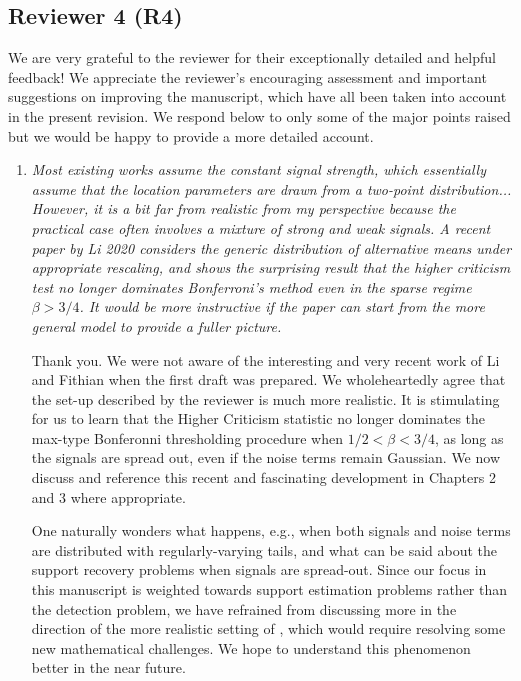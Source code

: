 \documentclass[11pt]{article}
\begin{document}
   \subsection{Reviewer 4 (R4)}
   
   We are very grateful to the reviewer for their exceptionally detailed and helpful feedback!  We appreciate the reviewer's encouraging assessment and 
   important suggestions on improving the manuscript, which have all been taken into account in the present revision.  We respond below to only some
   of the major points raised but we would be happy to provide a more detailed account.
  
   \begin{enumerate}
    \item {\em Most existing works assume the constant signal strength, which essentially assume that the location parameters are drawn from a two-point distribution... However, it is a bit far from realistic from my perspective because the practical case often involves a mixture of strong and weak signals. A recent paper by Li 2020 considers the generic distribution of alternative means under appropriate rescaling, and shows the surprising result that the higher criticism test no longer dominates Bonferroni’s method even in the sparse regime $\beta >3/4$. It would be more instructive if the paper can start from the more general model to provide a fuller picture.}
    
    \medskip
    Thank you.  We were not aware of the interesting and very recent work \cite{li2020optimality} of Li and Fithian when the first draft was prepared. We wholeheartedly agree that the set-up described by the reviewer is much more realistic.
    It is stimulating for us to learn that the Higher Criticism statistic no longer dominates the max-type Bonferonni thresholding procedure when $1/2<\beta<3/4$, as long as the signals are spread out, even if the noise terms remain Gaussian.
    We now discuss and reference this recent and fascinating development in Chapters 2 and 3 where appropriate. 

    One naturally wonders what happens, e.g., when both signals and noise terms are distributed with regularly-varying tails, and what can be said about the support recovery problems when signals are spread-out.
    Since our focus in this manuscript is weighted towards support estimation problems rather than the detection problem, we have refrained from discussing more in the direction of the more realistic setting of \cite{li2020optimality}, which would require resolving some new mathematical challenges. 
    We hope to understand this phenomenon better in the near future.
     

\end{enumerate}
\end{document}
